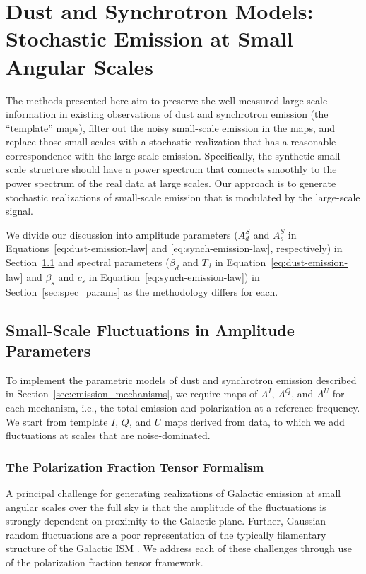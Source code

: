 \documentclass[twocolumn]{aastex631}
\begin{document}
\section{Dust and Synchrotron Models: Stochastic Emission at Small Angular Scales} \label{sec:small_scales}
The methods presented here aim to preserve the well-measured large-scale information in existing observations of dust and synchrotron emission (the ``template'' maps), filter out the noisy small-scale emission in the maps, and replace those small scales with a stochastic realization that has a reasonable correspondence with the large-scale emission. Specifically, the synthetic small-scale structure should have a power spectrum that connects smoothly to the power spectrum of the real data at large scales. Our approach is to generate stochastic realizations of small-scale emission that is modulated by the large-scale signal.

We divide our discussion into amplitude parameters ($A_d^S$ and $A_s^S$ in Equations~\ref{eq:dust-emission-law} and \ref{eq:synch-emission-law}, respectively) in Section~\ref{sec:amp_params} and spectral parameters ($\beta_d$ and $T_d$ in Equation~\ref{eq:dust-emission-law} and $\beta_s$ and $c_s$ in Equation~\ref{eq:synch-emission-law}) in Section~\ref{sec:spec_params} as the methodology differs for each.

\subsection{Small-Scale Fluctuations in Amplitude Parameters} \label{sec:amp_params}
To implement the parametric models of dust and synchrotron emission described in Section~\ref{sec:emission_mechanisms}, we require maps of $A^I$, $A^Q$, and $A^U$ for each mechanism, i.e., the total emission and polarization at a reference frequency. We start from template $I$, $Q$, and $U$ maps derived from data, to which we add fluctuations at scales that are noise-dominated. %

\subsubsection{The Polarization Fraction Tensor Formalism} \label{sec:polfrac}
A principal challenge for generating realizations of Galactic emission at small angular scales over the full sky is that the amplitude of the fluctuations is strongly dependent on proximity to the Galactic plane. Further, Gaussian random fluctuations are a poor representation of the typically filamentary structure of the Galactic ISM \citep[e.g.,][]{Hacar:2023}. We address each of these challenges through use of the polarization fraction tensor framework.
\end{document}
